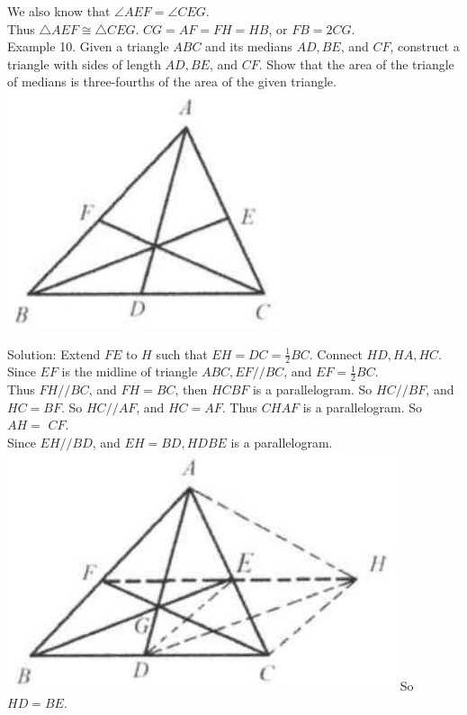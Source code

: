 \documentclass[10pt]{article}
\begin{document}
We also know that \(\angle A E F=\angle C E G\).\\
Thus \(\triangle A E F \cong \triangle C E G\). \(C G=A F=F H=H B\), or \(F B=2 C G\).\\
Example 10. Given a triangle \(A B C\) and its medians \(A D, B E\), and \(C F\), construct a triangle with sides of length \(A D, B E\), and \(C F\). Show that the area of the triangle of medians is three-fourths of the area of the given triangle.\\
\includegraphics[max width=\textwidth, center]{2025_04_17_97bc1f7e44d93c271a88g-040(2)}


Solution:
Extend \(F E\) to \(H\) such that \(E H=D C=\frac{1}{2} B C\). Connect \(H D, H A, H C\).\\
Since \(E F\) is the midline of triangle \(A B C, E F / / B C\), and \(E F=\frac{1}{2} B C\).\\
Thus \(F H / / B C\), and \(F H=B C\), then \(H C B F\) is a parallelogram. So \(H C / / B F\), and \(H C=B F\). So \(H C / / A F\), and \(H C=A F\). Thus \(C H A F\) is a parallelogram. So \(A H=\) \(C F\).\\
Since \(E H / / B D\), and \(E H=B D, H D B E\) is a parallelogram.\\
\includegraphics[max width=\textwidth]{2025_04_17_97bc1f7e44d93c271a88g-041} So \(H D=B E\).
\end{document}
